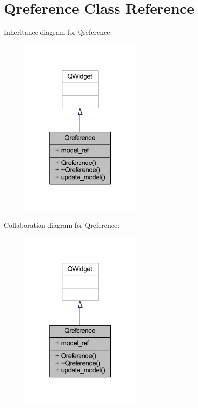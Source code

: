 \hypertarget{class_qreference}{}\section{Qreference Class Reference}
\label{class_qreference}


Inheritance diagram for Qreference\+:
\nopagebreak
\begin{figure}[H]
\begin{center}
\leavevmode
\includegraphics[width=172pt]{class_qreference__inherit__graph}
\end{center}
\end{figure}


Collaboration diagram for Qreference\+:
\nopagebreak
\begin{figure}[H]
\begin{center}
\leavevmode
\includegraphics[width=172pt]{class_qreference__coll__graph}
\end{center}
\end{figure}
